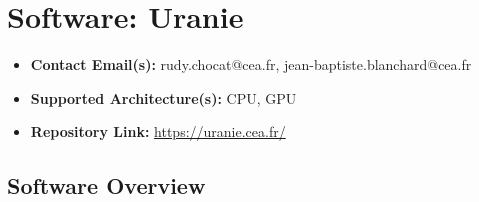 \section{Software: Uranie}
\label{sec:WP6:Uranie:software}

\begin{itemize}
    \item \textbf{Contact Email(s):} rudy.chocat@cea.fr, jean-baptiste.blanchard@cea.fr
    \item \textbf{Supported Architecture(s):} CPU, GPU
    \item \textbf{Repository Link:} \href{https://uranie.cea.fr/}{https://uranie.cea.fr/}
\end{itemize}

\subsection{Software Overview}
\label{sec:WP6:Uranie:summary}

